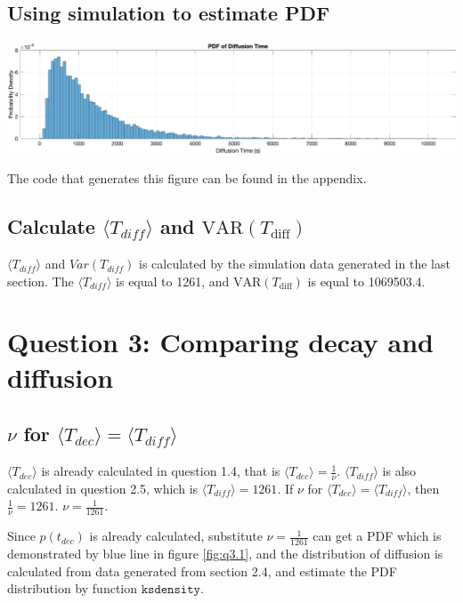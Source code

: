 \subsection{Using simulation to estimate PDF}

\includegraphics[width=\linewidth]{img/figure2.eps}
\label{fig:q2.4}

The code that generates this figure can be found in the appendix.


\subsection{Calculate $\langle T_{diff} \rangle$ and $\text{VAR}(T_{\text{diff}}) $}

$\langle T_{diff} \rangle$ and $Var(T_{diff} )$ is calculated 
by the simulation data generated in the last section. 
The $\langle T_{diff} \rangle$ is equal to 1261, 
and $\text{VAR}(T_{\text{diff}}) $ is equal to 1069503.4.

\section{Question 3: Comparing decay and diffusion}

\subsection{$\nu$ for $\langle T_{dec} \rangle =  \langle T_{diff} \rangle$}

$\langle T_{dec} \rangle$ is already calculated in question 1.4, 
that is $\langle T_{dec} \rangle = \frac{1}{\nu}$. 
$\langle T_{diff} \rangle$ is also calculated in 
question 2.5, 
which is $\langle T_{diff} \rangle = 1261$.
If $\nu$ for $\langle T_{dec} \rangle =  \langle T_{diff} \rangle$, 
then $\frac{1}{\nu} = 1261$. 
$\nu = \frac{1}{1261}$. 

Since $p(t_{dec})$ is already calculated, 
substitute $\nu = \frac{1}{1261}$ can get a 
PDF which is demonstrated by 
blue line in figure \ref{fig:q3.1}, 
and the distribution of diffusion is calculated from 
data generated from section 2.4, 
and estimate the PDF distribution 
by function $\mathtt{ksdensity}$.

